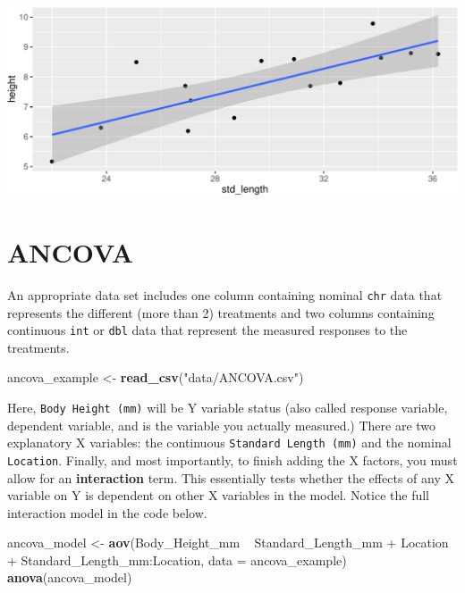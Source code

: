 \documentclass[twoside, 12pt]{article}
\newenvironment{Shaded}{\begin{snugshade}}{\end{snugshade}}
\newcommand{\KeywordTok}[1]{\textcolor[rgb]{0.13,0.29,0.53}{\textbf{{#1}}}}
\newcommand{\DataTypeTok}[1]{\textcolor[rgb]{0.13,0.29,0.53}{{#1}}}
\newcommand{\StringTok}[1]{\textcolor[rgb]{0.31,0.60,0.02}{{#1}}}
\newcommand{\NormalTok}[1]{{#1}}
\begin{document}
\includegraphics{skeleton_files/figure-latex/unnamed-chunk-35-1.pdf}

\section{ANCOVA}\label{ancova}

An appropriate data set includes one column containing nominal
\texttt{chr} data that represents the different (more than 2) treatments
and two columns containing continuous \texttt{int} or \texttt{dbl} data
that represent the measured responses to the treatments.

\begin{Shaded}
\begin{Highlighting}[]
\NormalTok{ancova_example <-}\StringTok{ }\KeywordTok{read_csv}\NormalTok{(}\StringTok{"data/ANCOVA.csv"}\NormalTok{)}
\end{Highlighting}
\end{Shaded}

Here, \texttt{Body\ Height\ (mm)} will be Y variable status (also called
response variable, dependent variable, and is the variable you actually
measured.) There are two explanatory X variables: the continuous
\texttt{Standard\ Length\ (mm)} and the nominal \texttt{Location}.
Finally, and most importantly, to finish adding the X factors, you must
allow for an \textbf{interaction} term. This essentially tests whether
the effects of any X variable on Y is dependent on other X variables in
the model. Notice the full interaction model in the code below.

\begin{Shaded}
\begin{Highlighting}[]
\NormalTok{ancova_model <-}\StringTok{ }\KeywordTok{aov}\NormalTok{(Body_Height_mm ~}\StringTok{ }\NormalTok{Standard_Length_mm +}\StringTok{ }\NormalTok{Location }
                    \NormalTok{+}\StringTok{ }\NormalTok{Standard_Length_mm:Location, }
                    \DataTypeTok{data =} \NormalTok{ancova_example)}
\KeywordTok{anova}\NormalTok{(ancova_model)}
\end{Highlighting}
\end{Shaded}
\end{document}
